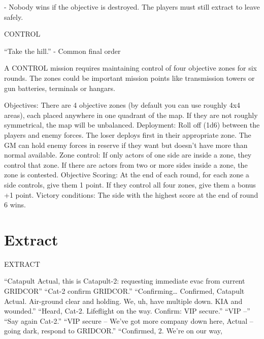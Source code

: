           - Nobody wins if the objective is destroyed. The players must still extract to leave safely.

CONTROL

         “Take the hill.”
                      -    Common final order

A CONTROL mission requires maintaining control of four objective zones for six rounds. The
zones could be important mission points like transmission towers or gun batteries, terminals or
hangars.

Objectives: There are 4 objective zones (by default you can use roughly 4x4 areas), each placed
anywhere in one quadrant of the map. If they are not roughly symmetrical, the map will be
unbalanced.
Deployment: Roll off (1d6) between the players and enemy forces. The loser deploys first in their
appropriate zone. The GM can hold enemy forces in reserve if they want but doesn’t have more
than normal available.
Zone control: If only actors of one side are inside a zone, they control that zone. If there are
actors from two or more sides inside a zone, the zone is contested.
Objective Scoring: At the end of each round, for each zone a side controls, give them 1 point. If
they control all four zones, give them a bonus +1 point.
Victory conditions: The side with the highest score at the end of round 6 wins.




\section{Extract}


                                                                     EXTRACT

                                                                     “Catapult Actual, this is Catapult-2:
                                                                     requesting immediate evac from current
                                                                     GRIDCOR”
                                                                            “Cat-2 confirm GRIDCOR.”
                                                                     “Confirming… Confirmed, Catapult Actual.
                                                                     Air-ground clear and holding. We, uh, have
                                                                     multiple down. KIA and wounded.”
                                                                            “Heard, Cat-2. Lifeflight on the way.
                                                                     Confirm: VIP secure.”
                                                                     “VIP --”
                                                                            “Say again Cat-2.”
                                                                     “VIP secure -- We’ve got more company
                                                                     down here, Actual -- going dark, respond to
                                                                     GRIDCOR.”
                                                                            “Confirmed, 2. We’re on our way,

